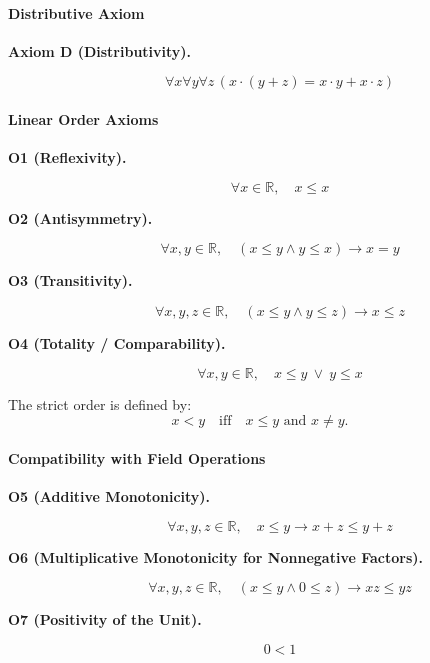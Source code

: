 \paragraph{Distributive Axiom}

\begin{description}

\item[\textbf{Axiom D (Distributivity).}]
\[
\forall x \forall y \forall z \, (x\cdot (y+z) = x\cdot y + x\cdot z)
\]

\end{description}


\paragraph{Linear Order Axioms}

\begin{description}

\item[\textbf{O1 (Reflexivity).}]
\[
\forall x\in\mathbb{R},\quad x \le x
\]

\item[\textbf{O2 (Antisymmetry).}]
\[
\forall x,y\in\mathbb{R},\quad
(x \le y \wedge y \le x) \rightarrow x = y
\]

\item[\textbf{O3 (Transitivity).}]
\[
\forall x,y,z\in\mathbb{R},\quad
(x \le y \wedge y \le z) \rightarrow x \le z
\]

\item[\textbf{O4 (Totality / Comparability).}]
\[
\forall x,y\in\mathbb{R},\quad
x \le y \ \vee\ y \le x
\]

\end{description}

\begin{exposition}
The strict order is defined by:
\[
x < y
\quad\text{iff}\quad
x \le y \text{ and } x \neq y.
\]
\end{exposition}

\paragraph{Compatibility with Field Operations}

\begin{description}

\item[\textbf{O5 (Additive Monotonicity).}]
\[
\forall x,y,z\in\mathbb{R},\quad
x \le y \rightarrow x+z \le y+z
\]

\item[\textbf{O6 (Multiplicative Monotonicity for Nonnegative Factors).}]
\[
\forall x,y,z\in\mathbb{R},\quad
(x \le y \wedge 0 \le z) \rightarrow xz \le yz
\]

\item[\textbf{O7 (Positivity of the Unit).}]
\[
0 < 1
\]

\end{description}

